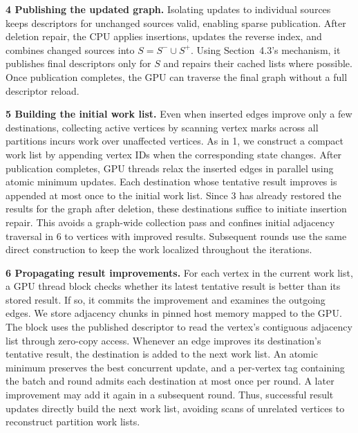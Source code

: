 \textbf{4 Publishing the updated graph.} Isolating updates to individual sources keeps descriptors for unchanged sources valid, enabling sparse publication. After deletion repair, the CPU applies insertions, updates the reverse index, and combines changed sources into $S=S^-\cup S^+$. Using Section~4.3's mechanism, it publishes final descriptors only for $S$ and repairs their cached lists where possible. Once publication completes, the GPU can traverse the final graph without a full descriptor reload.

\textbf{5 Building the initial work list.} Even when inserted edges improve only a few destinations, collecting active vertices by scanning vertex marks across all partitions incurs work over unaffected vertices. As in 1, we construct a compact work list by appending vertex IDs when the corresponding state changes. After publication completes, GPU threads relax the inserted edges in parallel using atomic minimum updates. Each destination whose tentative result improves is appended at most once to the initial work list. Since 3 has already restored the results for the graph after deletion, these destinations suffice to initiate insertion repair. This avoids a graph-wide collection pass and confines initial adjacency traversal in 6 to vertices with improved results. Subsequent rounds use the same direct construction to keep the work localized throughout the iterations.

\textbf{6 Propagating result improvements.} For each vertex in the current work list, a GPU thread block checks whether its latest tentative result is better than its stored result. If so, it commits the improvement and examines the outgoing edges. We store adjacency chunks in pinned host memory mapped to the GPU. The block uses the published descriptor to read the vertex's contiguous adjacency list through zero-copy access. Whenever an edge improves its destination's tentative result, the destination is added to the next work list. An atomic minimum preserves the best concurrent update, and a per-vertex tag containing the batch and round admits each destination at most once per round. A later improvement may add it again in a subsequent round. Thus, successful result updates directly build the next work list, avoiding scans of unrelated vertices to reconstruct partition work lists.

